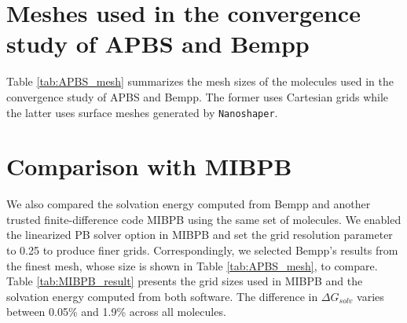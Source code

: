 \small{
\section{Meshes used in the convergence study of APBS and Bempp}\label{sec:apbs_mesh}
Table \ref{tab:APBS_mesh} summarizes the mesh sizes of the molecules used in the convergence study of APBS and Bempp.
The former uses Cartesian grids while the latter uses surface meshes generated by \texttt{Nanoshaper}.

\begin{table}[]
    \centering
    \caption{Mesh sizes of the molecules used in the convergence study of APBS and Bempp.}
    \label{tab:APBS_mesh}
\end{table}

\section{Comparison with MIBPB}\label{sec:comp_mibpb}
We also compared the solvation energy computed from Bempp and another trusted finite-difference code MIBPB using the same set of molecules.
We enabled the linearized PB solver option in MIBPB and set the grid resolution parameter to 0.25 to produce finer grids.
Correspondingly, we selected Bempp's results from the finest mesh, whose size is shown in Table \ref{tab:APBS_mesh}, to compare.
Table \ref{tab:MIBPB_result} presents the grid sizes used in MIBPB and the solvation energy computed from both software.
The difference in $\Delta G_{solv}$ varies between 0.05\% and 1.9\% across all molecules.

}
